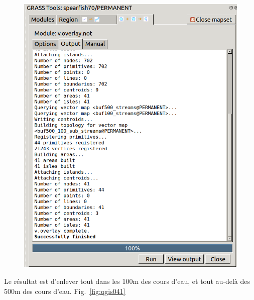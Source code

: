 \begin{figure}[htbp]
   \centering
   \includegraphics[scale=0.3]{qgis040.png}
   \caption{}
   \label{fig:qgis040}
\end{figure}

Le r\'esultat est d'enlever tout dans les 100m des cours d'eau, et tout au-del\`a des 500m des cours d'eau. Fig.~\ref{fig:qgis041}

